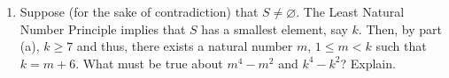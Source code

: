 \documentclass[12pt]{article}
\begin{document}
\begin{enumerate}
\begin{enumerate}
	
	
   

	\item Suppose (for the sake of contradiction) that $S \neq \varnothing$. The Least Natural Number Principle implies that $S$ has a smallest element, say $k$. Then, by part (a), $k \geq 7$ and thus, there exists a natural number $m$, $1 \leq m < k$ such that $k = m + 6$. What must be true about $m^4 - m^2$ and $k^4 - k^2$? Explain. \\
	

\end{enumerate}
\end{enumerate}
\end{document}
